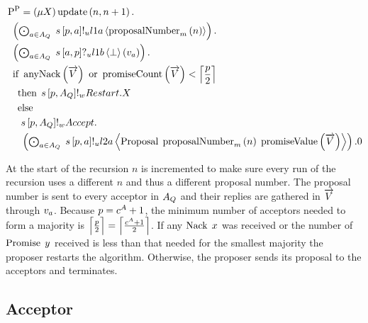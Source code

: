 \begin{align*}
&\Pp{} = \Mu{X} \update{n}{n + 1} .\\
&\Indent{1}\DotForall{\AcceptorIndex\in\AQ}{\SendUnreliableP{s}{\ProposerIndex}{\AcceptorIndex}{\LOneA}{\proposalNumber{n}{m}}} .\\
&\Indent{1}\DotForall{\AcceptorIndex\in\AQ}{\ReceiveUnreliableP{s}{\AcceptorIndex}{\ProposerIndex}{\LOneB}{\bot}{v_{\AcceptorIndex}}} .\\
&\Indent{1}\If{\anyNack{\VectorV} \tOr \promiseCount{\VectorV} < \ceil{\frac{\ProposerIndex}{2}}}\\
&\Indent{2}\Then{\SendWeaklyP{s}{\ProposerIndex}{\AQ}{\Restart}{X}}\\
&\Indent{2}\Else{\\
&\Indent{3}\SendWeaklyP{s}{\ProposerIndex}{\AQ}{\Accept}{\\
&\Indent{3}\DotForall{\AcceptorIndex\in\AQ}{\SendUnreliableP{s}{\ProposerIndex}{\AcceptorIndex}{\LTwoA}{\ProposalC{\proposalNumber{n}{m}}{\promiseValue{\VectorV}}}}.\End
}}
\end{align*}

At the start of the recursion $n$ is incremented to make sure every run of the recursion uses a different $n$ and thus a different proposal number.
The proposal number is sent to every acceptor in $A_Q$ and their replies are gathered in $\overrightarrow{V}$ through $v_{a}$.
Because $p = c^A + 1$, the minimum number of acceptors needed to form a majority is $\Big\lceil \frac{p}{2} \Big\rceil = \Big\lceil \frac{c^A + 1}{2} \Big\rceil$.
If any $\operatorname{Nack}\; x$ was received or the number of $\operatorname{Promise}\; y$ received is less than that needed for the smallest majority the proposer restarts the algorithm.
Otherwise, the proposer sends its proposal to the acceptors and terminates.

\subsection{Acceptor}

